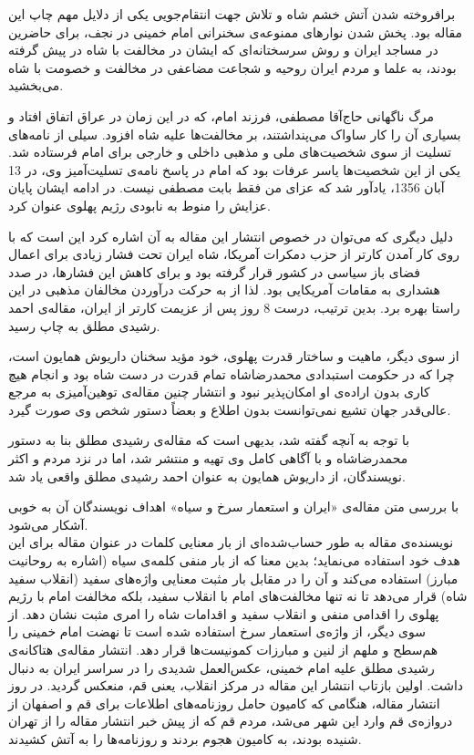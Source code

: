 \documentclass{article}
\begin{document}
برافروخته شدن آتش خشم شاه و تلاش جهت انتقام‌جویی یکی از دلایل مهم چاپ این مقاله بود. پخش شدن نوارهای ممنوعه‌ی سخنرانی امام خمینی در نجف، برای حاضرین در مساجد ایران و روش سرسختانه‌ای که ایشان در مخالفت با شاه در پیش گرفته بودند، به علما و مردم ایران روحیه و شجاعت مضاعفی در مخالفت و خصومت با شاه می‌بخشید.
\par
مرگ ناگهانی حاج‌آقا مصطفی، فرزند امام، که در این زمان در عراق اتفاق افتاد و بسیاری آن را کار ساواک می‌پنداشتند، بر مخالفت‌ها علیه شاه افزود. سیلی از نامه‌های تسلیت از سوی شخصیت‌های ملی و مذهبی داخلی و خارجی برای امام فرستاده شد. یکی از این شخصیت‌ها یاسر عرفات بود که امام در پاسخ نامه‌ی تسلیت‌آمیز وی، در 13 آبان‌ 1356، یادآور شد که عزای من فقط بابت مصطفی نیست. در ادامه ایشان پایان عزایش را منوط به نابودی رژیم پهلوی عنوان کرد.
\par
دلیل دیگری که می‌توان در خصوص انتشار این مقاله به آن اشاره کرد این است که با روی کار آمدن کارتر از حزب دمکرات آمریکا، شاه ایران تحت فشار زیادی برای اعمال فضای باز سیاسی در کشور قرار گرفته بود و برای کاهش این فشارها، در صدد هشداری به مقامات آمریکایی بود. لذا از به حرکت درآوردن مخالفان مذهبی در این راستا بهره برد. بدین ترتیب، درست 8 روز پس از عزیمت کارتر از ایران، مقاله‌ی احمد رشیدی مطلق به چاپ رسید.
\par
از سوی دیگر، ماهیت و ساختار قدرت پهلوی، خود مؤید سخنان داریوش همایون است، چرا که در حکومت استبدادی محمدرضاشاه تمام قدرت در دست شاه بود و انجام هیچ کاری بدون اراده‌ی او امکان‌پذیر نبود و انتشار چنین مقاله‌ی توهین‌آمیزی به مرجع عالی‌قدر جهان تشیع نمی‌توانست بدون اطلاع و بعضاً دستور شخص وی صورت گیرد.
\par
با توجه به آنچه گفته شد، بدیهی است که مقاله‌ی رشیدی مطلق بنا به دستور محمدرضاشاه و با آگاهی کامل وی تهیه و منتشر شد، اما در نزد مردم و اکثر نویسندگان، از داریوش همایون به عنوان احمد رشیدی مطلق واقعی یاد شد.
\par
با بررسی متن مقاله‌ی «ایران و استعمار سرخ و سیاه» اهداف نویسندگان آن به خوبی آشکار می‌شود. \\
نویسنده‌ی مقاله به طور حساب‌شده‌ای از بار معنایی کلمات در عنوان مقاله برای این هدف خود استفاده می‌نماید؛ بدین معنا که از بار منفی کلمه‌ی سیاه (اشاره به روحانیت مبارز) استفاده می‌کند و آن را در مقابل بار مثبت معنایی واژه‌های سفید (انقلاب سفید شاه) قرار می‌دهد تا نه تنها مخالفت‌های امام با انقلاب سفید، بلکه مخالفت امام با رژیم پهلوی را اقدامی منفی و انقلاب سفید و اقدامات شاه را امری مثبت نشان دهد. از سوی دیگر، از واژه‌ی استعمار سرخ استفاده شده است تا نهضت امام خمینی را هم‌سطح و ملهم از لنین و مبارزات کمونیست‌ها قرار دهد.
انتشار مقاله‌ی هتاکانه‌ی رشیدی مطلق علیه امام خمینی، عکس‌العمل شدیدی را در سراسر ایران به دنبال داشت. اولین بازتاب انتشار این مقاله در مرکز انقلاب، یعنی قم، منعکس گردید. در روز انتشار مقاله، هنگامی که کامیون حامل روزنامه‌های اطلاعات برای قم و اصفهان از دروازه‌ی قم وارد این شهر می‌شد، مردم قم که از پیش خبر انتشار مقاله را از تهران شنیده بودند، به کامیون هجوم بردند و روزنامه‌ها را به آتش کشیدند.
\end{document}
